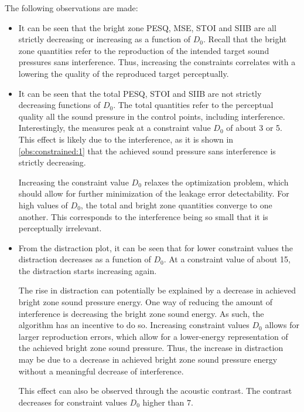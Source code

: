 The following observations are made:
\begin{itemize}
    \item It can be seen that the bright zone PESQ, MSE, STOI and SIIB are all strictly decreasing or increasing as a 
        function of $D_0$.
        Recall that the bright zone quantities refer to the reproduction of the intended target sound pressures sans 
        interference.
        Thus, increasing the constraints correlates with a lowering the quality of the reproduced target
        perceptually.
        \label{obs:constrained:1}

    \item It can be seen that the total PESQ, STOI and SIIB are not strictly decreasing functions of $D_0$.
        The total quantities refer to the perceptual quality all the sound pressure in the control points,
        including interference.
        Interestingly, the measures peak at a constraint value $D_0$ of about 3 or 5. 
        This effect is likely due to the interference, as it is shown in \autoref{obs:constrained:1} that 
        the achieved sound pressure sans interference is strictly decreasing.

        Increasing the constraint value $D_0$ relaxes the optimization problem, 
        which should allow for further minimization of the leakage error detectability.
        For high values of $D_0$, the total and bright zone quantities converge to one another.
        This corresponds to the interference being so small that it is perceptually irrelevant.
        \label{obs:constrained:2}

    \item From the distraction plot, it can be seen that for lower constraint values the distraction decreases as 
        a function of $D_0$.
        At a constraint value of about 15, the distraction starts increasing again.

        The rise in distraction can potentially be explained by a decrease in achieved bright zone sound pressure energy.
        One way of reducing the amount of interference is decreasing the bright zone sound energy.
        As such, the algorithm has an incentive to do so.
        Increasing constraint values $D_0$ allows for larger reproduction errors, which allow for a lower-energy
        representation of the achieved bright zone sound pressure.
        Thus, the increase in distraction may be due to a decrease in achieved bright zone sound pressure energy without
        a meaningful decrease of interference.

        This effect can also be observed through the acoustic contrast. 
        The contrast decreases for constraint values $D_0$ higher than $7$. 
        \label{obs:constrained:3}
\end{itemize}
